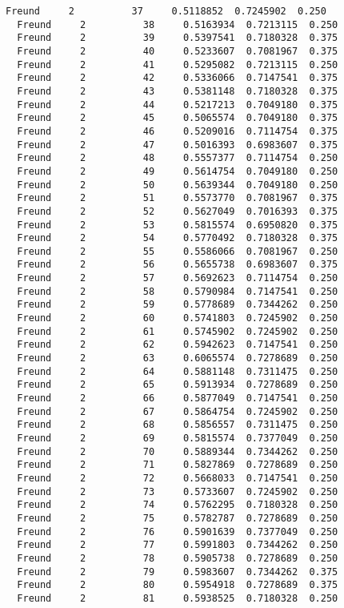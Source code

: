 \documentclass[11pt]{article}
\begin{document}
\begin{Verbatim}[commandchars=\\\{\}]
  Freund     2          37     0.5118852  0.7245902  0.250
  Freund     2          38     0.5163934  0.7213115  0.250
  Freund     2          39     0.5397541  0.7180328  0.375
  Freund     2          40     0.5233607  0.7081967  0.375
  Freund     2          41     0.5295082  0.7213115  0.250
  Freund     2          42     0.5336066  0.7147541  0.375
  Freund     2          43     0.5381148  0.7180328  0.375
  Freund     2          44     0.5217213  0.7049180  0.375
  Freund     2          45     0.5065574  0.7049180  0.375
  Freund     2          46     0.5209016  0.7114754  0.375
  Freund     2          47     0.5016393  0.6983607  0.375
  Freund     2          48     0.5557377  0.7114754  0.250
  Freund     2          49     0.5614754  0.7049180  0.250
  Freund     2          50     0.5639344  0.7049180  0.250
  Freund     2          51     0.5573770  0.7081967  0.375
  Freund     2          52     0.5627049  0.7016393  0.375
  Freund     2          53     0.5815574  0.6950820  0.375
  Freund     2          54     0.5770492  0.7180328  0.375
  Freund     2          55     0.5586066  0.7081967  0.250
  Freund     2          56     0.5655738  0.6983607  0.375
  Freund     2          57     0.5692623  0.7114754  0.250
  Freund     2          58     0.5790984  0.7147541  0.250
  Freund     2          59     0.5778689  0.7344262  0.250
  Freund     2          60     0.5741803  0.7245902  0.250
  Freund     2          61     0.5745902  0.7245902  0.250
  Freund     2          62     0.5942623  0.7147541  0.250
  Freund     2          63     0.6065574  0.7278689  0.250
  Freund     2          64     0.5881148  0.7311475  0.250
  Freund     2          65     0.5913934  0.7278689  0.250
  Freund     2          66     0.5877049  0.7147541  0.250
  Freund     2          67     0.5864754  0.7245902  0.250
  Freund     2          68     0.5856557  0.7311475  0.250
  Freund     2          69     0.5815574  0.7377049  0.250
  Freund     2          70     0.5889344  0.7344262  0.250
  Freund     2          71     0.5827869  0.7278689  0.250
  Freund     2          72     0.5668033  0.7147541  0.250
  Freund     2          73     0.5733607  0.7245902  0.250
  Freund     2          74     0.5762295  0.7180328  0.250
  Freund     2          75     0.5782787  0.7278689  0.250
  Freund     2          76     0.5901639  0.7377049  0.250
  Freund     2          77     0.5991803  0.7344262  0.250
  Freund     2          78     0.5905738  0.7278689  0.250
  Freund     2          79     0.5983607  0.7344262  0.375
  Freund     2          80     0.5954918  0.7278689  0.375
  Freund     2          81     0.5938525  0.7180328  0.250

\end{Verbatim}
\end{document}
